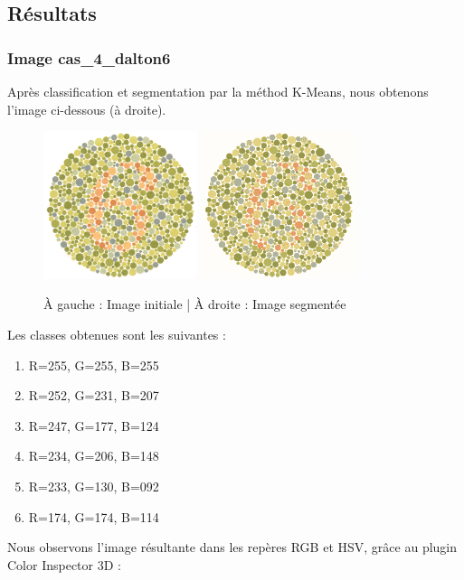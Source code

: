 \documentclass[a4paper]{article}
\begin{document}
\subsection{Résultats}

\subsubsection{Image cas\_4\_dalton6}

Après classification et segmentation par la méthod K-Means, nous obtenons l'image ci-dessous (à droite).

\begin{figure}[H]
\begin{center}
\includegraphics[width=170px]{../base/cas_4_dalton6.png}
\includegraphics[width=170px]{../resultats/cas_4_dalton6.png}
\end{center}
\caption{À gauche : Image initiale | À droite : Image segmentée}
\end{figure}

Les classes obtenues sont les suivantes :

\begin{enumerate}
  \item R=255, G=255, B=255
  \item R=252, G=231, B=207
  \item R=247, G=177, B=124
  \item R=234, G=206, B=148
  \item R=233, G=130, B=092
  \item R=174, G=174, B=114
\end{enumerate}

Nous observons l'image résultante dans les repères RGB et HSV, grâce au plugin Color Inspector 3D :
\end{document}
